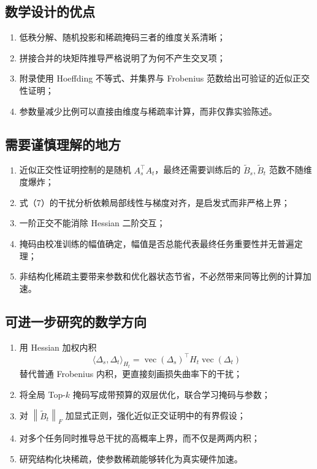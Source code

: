 \documentclass[UTF8,12pt,a4paper,fontset=none]{ctexart}
\numberwithin{equation}{section}
\newcommand{\norm}[1]{\left\lVert #1\right\rVert}
\begin{document}
\subsection{数学设计的优点}

\begin{enumerate}[label=\arabic*.,leftmargin=2.3em]
  \item 低秩分解、随机投影和稀疏掩码三者的维度关系清晰；
  \item 拼接合并的块矩阵推导严格说明了为何不产生交叉项；
  \item 附录使用 Hoeffding 不等式、并集界与 Frobenius 范数给出可验证的近似正交性证明；
  \item 参数量减少比例可以直接由维度与稀疏率计算，而非仅靠实验陈述。
\end{enumerate}

\subsection{需要谨慎理解的地方}

\begin{enumerate}[label=\arabic*.,leftmargin=2.3em]
  \item 近似正交性证明控制的是随机 $A_s^{\top}A_t$，最终还需要训练后的 $\widetilde B_s,\widetilde B_t$ 范数不随维度爆炸；
  \item 式（7）的干扰分析依赖局部线性与梯度对齐，是启发式而非严格上界；
  \item 一阶正交不能消除 Hessian 二阶交互；
  \item 掩码由校准训练的幅值确定，幅值是否总能代表最终任务重要性并无普遍定理；
  \item 非结构化稀疏主要带来参数和优化器状态节省，不必然带来同等比例的计算加速。
\end{enumerate}

\subsection{可进一步研究的数学方向}

\begin{enumerate}[label=\arabic*.,leftmargin=2.3em]
  \item 用 Hessian 加权内积
  \begin{equation*}
    \langle \Delta_s,\Delta_t\rangle_{H_t}
    =\operatorname{vec}(\Delta_s)^{\top}H_t\operatorname{vec}(\Delta_t)
  \end{equation*}
  替代普通 Frobenius 内积，更直接刻画损失曲率下的干扰；
  \item 将全局 Top-$k$ 掩码写成带预算的双层优化，联合学习掩码与参数；
  \item 对 $\norm{\widetilde B_t}_F$ 加显式正则，强化近似正交证明中的有界假设；
  \item 对多个任务同时推导总干扰的高概率上界，而不仅是两两内积；
  \item 研究结构化块稀疏，使参数稀疏能够转化为真实硬件加速。
\end{enumerate}
\end{document}
